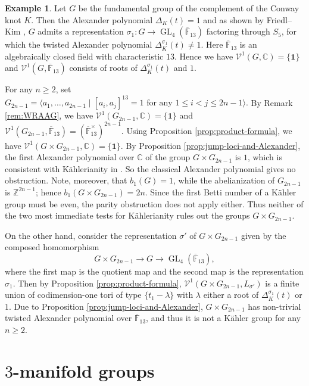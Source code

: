 \documentclass[11pt]{amsart}
\theoremstyle{definition}
\newtheorem{example}[theorem]{Example}
\newcommand{\Z}{\mathbb{Z}}
\newcommand{\C}{\mathbb{C}}
\newcommand{\F}{\mathbb{F}}
\newcommand{\bo}{\mathbf{1}}
\newcommand{\VV}{\mathcal{V}}
\DeclareMathOperator{\GL}{GL}
\begin{document}
\begin{example}
\label{ex:KT-knot product with WRRAG}
Let $G$ be  the fundamental group of the complement of the Conway knot $K$.
Then the Alexander polynomial $\Delta_K(t) = 1$ and as shown by 
Friedl--Kim \cite[Sec.~5.2]{FK06}, $G$ admits a representation 
$\sigma_1\colon G\to \GL_4(\overline{\F}_{13})$ factoring 
through $S_5$, for which the twisted Alexander polynomial 
$\Delta_K^{\sigma_1}(t) \ne 1$. Here $\overline{\F}_{13}$ is 
an algebraically closed field with characteristic $13$. Hence we have 
$ \VV^1(G,\C)=\{\bo\}$ and $ \VV^1(G, \overline{\F}_{13}) $ consists of roots of 
$ \Delta_K^{\sigma_1}(t) $ and $1$.

For any $n\geq 2$, set $G_{2n-1}= \langle a_1,\dots,a_{2n-1} \mid  
[a_i,a_j]^{13}=1 \text{ for any }  1\leq i<j\leq 2n-1 \rangle.$
By Remark \ref{rem:WRAAG}, we have
$ \VV^1(G_{2n-1},\C)=\{\bo\}$ and $ \VV^1(G_{2n-1},\overline{\F}_{13})= 
(\overline{\F}_{13}^\times)^{2n-1}$. 
Using Proposition \ref{prop:product-formula}, we have 
$\VV^1( G\times G_{2n-1},\C)= \{\bo\}. $ By Proposition \ref{prop:jump-loci-and-Alexander}, 
the first Alexander polynomial over $\C$ of the group $G\times G_{2n-1}$ is $1$, which 
is consistent with K\"{a}hlerianity in \cite[Theorem 4.3(3)]{DPS-imrn}. So the classical Alexander 
polynomial gives no obstruction.
Note, moreover, that $b_1(G)=1$, while the abelianization of $G_{2n-1}$ 
is $\Z^{2n-1}$; hence $b_1(G\times G_{2n-1})=2n$. Since the first Betti 
number of a K\"{a}hler group must be even, the parity obstruction does 
not apply either. Thus neither of the two most immediate tests for 
K\"{a}hlerianity rules out the groups $G\times G_{2n-1}$.
    
On the other hand, consider the representation $\sigma'$ of $G\times G_{2n-1}$ given 
by the composed homomorphism 
\[
G\times G_{2n-1} \longrightarrow G \longrightarrow  \GL_4(\overline{\F}_{13}),
\]
where the first map is the quotient map and the second map is 
the representation $\sigma_1$. Then by  Proposition \ref{prop:product-formula}, 
$\VV^1( G\times G_{2n-1}, L_{\sigma'})$ is a finite union
of codimension-one tori of type $\{ t_1-\lambda\}$ with $\lambda$ 
either a root of $ \Delta_K^{\sigma_1}(t) $ or $1$.
Due to Proposition \ref{prop:jump-loci-and-Alexander},  
$G\times G_{2n-1}$  has non-trivial twisted Alexander polynomial 
over $\overline{\F}_{13}$, and thus it is not a K\"{a}hler group for any $n\geq 2$.
\end{example}

\section{$3$-manifold groups} 
\label{sect:3-manifold}
\end{document}
